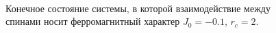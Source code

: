 \documentclass[14pt,a4paper,report]{ncc}
\begin{document}
\

\begin{figure}[h]
\begin{minipage}[h]{0.49\linewidth}
\end{minipage}
\hfill
\begin{minipage}[h]{0.49\linewidth}
\end{minipage}
\caption{Конечное состояние системы, в которой взаимодействие между спинами носит ферромагнитный характер $J_0=-0.1$, $r_c=2$.}
\label{ris:image8}
\end{figure}
\end{document}
